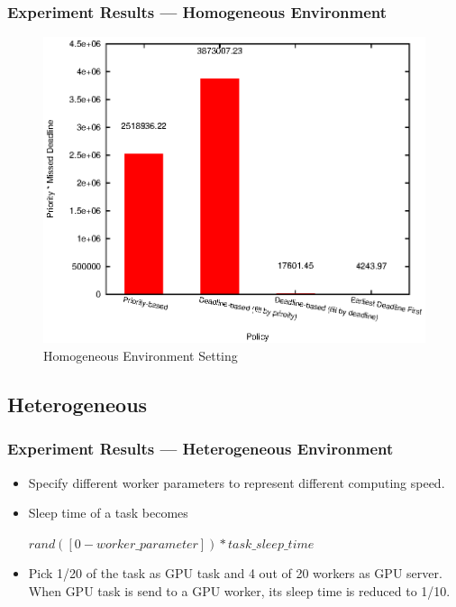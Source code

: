 \begin{frame}
  \frametitle{Experiment Results --- Homogeneous Environment}
  \begin{figure}[htbp]
    \centering
    \includegraphics[width=\textwidth,height=0.7\textheight,keepaspectratio]{figures/homo.eps}
    \caption{Homogeneous Environment Setting}
  \end{figure}
\end{frame}

\subsection{Heterogeneous}
\begin{frame}
  \frametitle{Experiment Results --- Heterogeneous Environment}
  \begin{itemize}
    \item Specify different worker parameters to represent different
      computing speed.
    \item Sleep time of a task becomes
      \begin{center}\begin{minipage}{.7\textwidth}
        \begin{exampleblock}{}
          \centering
          $rand([0-worker\_parameter])*task\_sleep\_time$
        \end{exampleblock}
      \end{minipage}\end{center}
    \item Pick 1/20 of the task as GPU task and 4 out of 20 workers as
      GPU server.  When GPU task is send to a GPU worker, its sleep
      time is reduced to 1/10.
  \end{itemize}
\end{frame}

